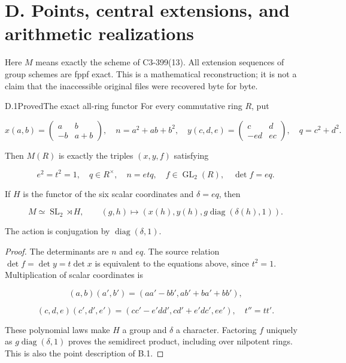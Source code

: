 \section{D. Points, central extensions, and arithmetic realizations}
\label{sec:D}
Here $M$ means exactly the scheme of C3-399(13).
All extension sequences of group schemes are fppf exact.
This is a mathematical reconstruction; it is not a claim
that the inaccessible original files were recovered byte for byte.

\begin{statement}{D.1}{Proved}{The exact all-ring functor}
For every commutative ring $R$, put

$$
x(a,b)=\begin{pmatrix}a&b\\-b&a+b\end{pmatrix},\quad
 n=a^2+ab+b^2,\quad
 y(c,d,e)=\begin{pmatrix}c&d\\-ed&ec\end{pmatrix},\quad q=c^2+d^2.
$$

Then $M(R)$ is exactly the triples $(x,y,f)$ satisfying

$$
e^2=t^2=1,\quad q\in R^\times,\quad n=etq,\quad
 f\in\operatorname{GL}_2(R),\quad\det f=eq.
$$

If $H$ is the functor of the six scalar coordinates and
$\delta=eq$, then

$$
M\simeq\operatorname{SL}_2\rtimes H,\qquad
 (g,h)\longmapsto(x(h),y(h),g\operatorname{diag}(\delta(h),1)).
$$

The action is conjugation by $\operatorname{diag}(\delta,1)$.
\end{statement}
\begin{proof}
The determinants are $n$ and $eq$.
The source relation $\det f=\det y=t\det x$ is equivalent
to the equations above, since $t^2=1$.
Multiplication of scalar coordinates is

$$
(a,b)(a',b')=(aa'-bb',ab'+ba'+bb'),
$$


$$
(c,d,e)(c',d',e')=(cc'-e'dd',cd'+e'dc',ee'),\quad t''=tt'.
$$

These polynomial laws make $H$ a group and $\delta$ a character.
Factoring $f$ uniquely as $g\operatorname{diag}(\delta,1)$
proves the semidirect product, including over nilpotent rings.
This is also the point description of B.1.
\end{proof}

